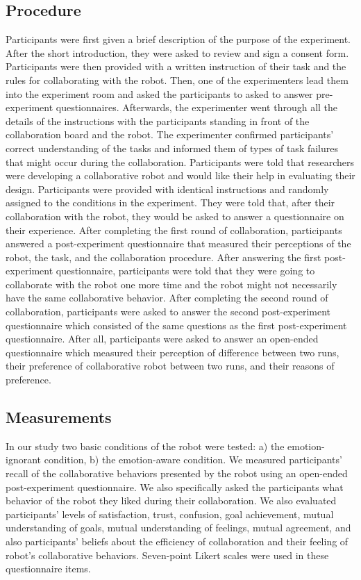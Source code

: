 \documentclass[12pt]{report}
\begin{document}
\vspace*{3mm}
\subsection{Procedure}
\label{sec:procedure}
Participants were first given a brief description of the purpose of the
experiment. After the short introduction, they were asked to review and sign a
consent form. Participants were then provided with a written instruction of
their task and the rules for collaborating with the robot. Then, one of the
experimenters lead them into the experiment room and asked the participants
to asked to answer pre-experiment questionnaires. Afterwards, the experimenter
went through all the details of the instructions with the participants
standing in front of the collaboration board and the robot. The experimenter
confirmed participants' correct understanding of the tasks and informed them
of types of task failures that might occur during the collaboration.
Participants were told that researchers were developing a collaborative robot
and would like their help in evaluating their design. Participants were provided
with identical instructions and randomly assigned to the conditions in the
experiment. They were told that, after their collaboration with the robot, they
would be asked to answer a questionnaire on their experience. After completing
the first round of collaboration, participants answered a post-experiment
questionnaire that measured their perceptions of the robot, the task, and
the collaboration procedure. After answering the first post-experiment
questionnaire, participants were told that they were going to collaborate with
the robot one more time and the robot might not necessarily have the same
collaborative behavior. After completing the second round of collaboration,
participants were asked to answer the second post-experiment questionnaire which
consisted of the same questions as the first post-experiment questionnaire.
After all, participants were asked to answer an open-ended questionnaire which
measured their perception of difference between two runs, their preference of
collaborative robot between two runs, and their reasons of preference.

\subsection{Measurements}
\label{sec:Measurements}
In our study two basic conditions of the robot were tested: a) the
emotion-ignorant condition, b) the emotion-aware condition. We measured
participants' recall of the collaborative behaviors presented by the robot using
an open-ended post-experiment questionnaire. We also specifically asked the
participants what behavior of the robot they liked during their collaboration.
We also evaluated participants' levels of satisfaction, trust, confusion, goal
achievement, mutual understanding of goals, mutual understanding of feelings,
mutual agreement, and also participants' beliefs about the efficiency of
collaboration and their feeling of robot's collaborative behaviors. Seven-point
Likert scales were used in these questionnaire items.
\end{document}
